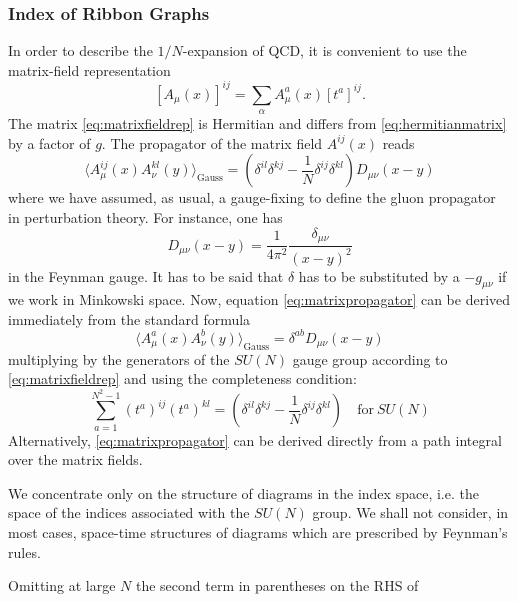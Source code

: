 \subsubsection{Index of Ribbon Graphs}
In order to describe the $1/N$-expansion of QCD, it is convenient to use the
matrix-field representation
\begin{equation}
  \left[A_{\mu}(x)\right]^{ij} = \sum_{\alpha} A^a_{\mu}(x)\left[t^a\right]^{ij}.
  \label{eq:matrixfieldrep}
\end{equation}
The matrix \eqref{eq:matrixfieldrep} is Hermitian and differs from
\eqref{eq:hermitianmatrix} by a factor of $g$.
The propagator of the matrix field $A^{ij}(x)$ reads
\begin{equation}
  \langle A^{ij}_\mu(x)A^{kl}_\nu(y)\rangle_{\mathrm{Gauss}}
  = \left(\delta^{il}\delta^{kj}
    - \frac{1}{N}\delta^{ij}\delta^{kl}\right)D_{\mu\nu}(x-y)
    \label{eq:matrixpropagator}
\end{equation}
where we have assumed, as usual, a gauge-fixing to define the gluon propagator
in perturbation theory. For instance, one has
\begin{equation}
  D_{\mu\nu}(x-y) = \frac{1}{4\pi^2}\frac{\delta_{\mu\nu}}{(x-y)^2}
  \label{eq:definitiontt}
\end{equation}
in the Feynman gauge. It has to be said that $\delta$ has to be substituted by
a $-g_{\mu\nu}$ if we work in Minkowski space. Now, equation
\eqref{eq:matrixpropagator} can be derived immediately from the standard
formula
\begin{equation}
  \langle A^{a}_\mu(x)A^{b}_\nu(y)\rangle_{\mathrm{Gauss}}
  = \delta^{ab}D_{\mu\nu}(x-y)
\end{equation}
multiplying by the generators of the $SU(N)$ gauge group according to
\eqref{eq:matrixfieldrep} and using the completeness condition:
\begin{equation}
  \sum_{a=1}^{N^2-1}(t^a)^{ij}(t^a)^{kl} = \left(\delta^{il}\delta^{kj}
  - \frac{1}{N}\delta^{ij}\delta^{kl}\right)\quad\boxed{\mathrm{for}\  SU(N)}
\end{equation}
Alternatively, \eqref{eq:matrixpropagator} can be derived directly from a path
integral over the matrix fields.
\par We concentrate only on the structure of diagrams in the index space, i.e.
the space of the indices associated with the $SU(N)$ group. We shall not
consider, in most cases, space-time structures of diagrams which are prescribed
by Feynman's rules.
\par Omitting at large $N$ the second term in parentheses on the RHS of
